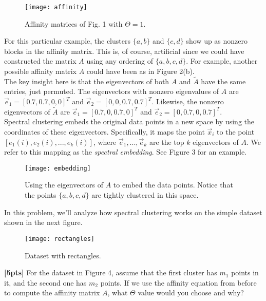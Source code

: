 \documentclass[paper=a4, fontsize=11pt]{scrartcl} %
\numberwithin{figure}{section} %
\numberwithin{table}{section} %
\begin{document}
\begin{figure}[h]
	\centering
	\texttt{[image: affinity]}
	\label{fig:aff}
	\caption{Affinity matrices of Fig. 1 with $\Theta = 1$.}
\end{figure}

For this particular example, the clusters $\{a, b\}$ and $\{c, d\}$ show up as nonzero blocks in the affinity matrix. This is, of course, artificial since we could have constructed the matrix $A$ using any ordering of $\{a, b, c, d\}$. For example, another possible affinity matrix $A$ could have been as in Figure 2(b). \\

The key insight here is that the eigenvectors of both $A$ and $\tilde{A}$ have the same entries, just permuted. The eigenvectors with nonzero eigenvalues of $A$ are $\vec{e}_1 = \left[ 0.7, 0.7, 0, 0 \right]^T$ and $\vec{e}_2 = \left[ 0, 0, 0.7, 0.7 \right]^T$. Likewise, the nonzero eigenvectors of $\tilde{A}$ are $\vec{e}_1 = \left[ 0.7, 0, 0.7, 0 \right]^T$ and $\vec{e}_2 = \left[ 0, 0.7, 0, 0.7 \right]^T$. \\

Spectral clustering embeds the original data points in a new space by using the coordinates of these eigenvectors. Specifically, it maps the point $\vec{x}_i$ to the point $\left[ e_1(i), e_2(i), ..., e_k(i) \right]$, where $\vec{e}_1, ..., \vec{e}_k$ are the top $k$ eigenvectors of $A$. We refer to this mapping as the \emph{spectral embedding}. See Figure 3 for an example. \\

\begin{figure}[h]
	\centering
	\texttt{[image: embedding]}
	\label{fig:embed}
	\caption{Using the eigenvectors of $A$ to embed the data points. Notice that the points $\{a, b, c, d\}$ are tightly clustered in this space.}
\end{figure}

In this problem, we'll analyze how spectral clustering works on the simple dataset shown in the next figure. \\

\begin{figure}[h]
	\centering
	\texttt{[image: rectangles]}
	\label{fig:rect}
	\caption{Dataset with rectangles.}
\end{figure}

\textbf{[5pts]} For the dataset in Figure 4, assume that the first cluster has $m_1$ points in it, and the second one has $m_2$ points. If we use the affinity equation from before to compute the affinity matrix $A$, what $\Theta$ value would you choose and why? \\
\end{document}
